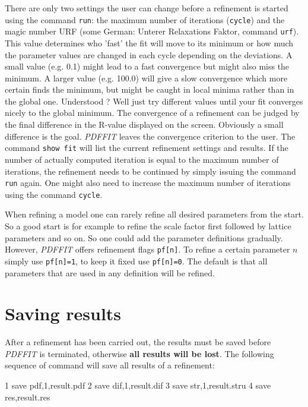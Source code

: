 There are only two settings the user can change before a refinement
is started using the command {\tt run}: the maximum number of iterations
({\tt cycle}) and the magic number URF (some German: Unterer Relaxations
Faktor, command {\tt urf}). This value determines who 'fast' the fit
will move to its minimum or how much the parameter values are changed
in each cycle depending on the deviations. A small value (e.g. 0.1) might
lead to a fast convergence but might also miss the minimum. A larger
value (e.g. 100.0) will give a slow convergence which more certain
finds the minimum, but might be caught in local minima rather than in
the global one. Understood ? Well just try different values until your
fit converges nicely to the global minimum. The convergence of a
refinement can be judged by the final difference in the R-value displayed
on the screen. Obviously a small difference is the goal. {\it PDFFIT}
leaves the convergence criterion to the user. The command {\tt show fit}
will list the current refinement settings and results. If the number of
actually computed iteration is equal to the maximum number of iterations,
the refinement needs to be continued by simply issuing the command
{\tt run} again. One might also need to increase the maximum number
of iterations using the command {\tt cycle}. \par

When refining a model one can rarely refine all desired parameters
from the start. So a good start is for example to refine the scale
factor first followed by lattice parameters and so on. So one could
add the parameter definitions gradually. However, {\it PDFFIT} offers
refinement flags {\tt pf[n]}. To refine a certain parameter $n$ simply
use {\tt pf[n]=1}, to keep it fixed use {\tt pf[n]=0}. The default is
that all parameters that are used in any definition will be refined.

\section{Saving results \label{fit_save}}

After a refinement has been carried out, the results must be
saved before {\it PDFFIT} is terminated, otherwise {\bf all
results will be lost}. The following sequence of command will
save all results of a refinement:

\footnotesize
\begin{MacVerbatim}
      1 save pdf,1,result.pdf
      2 save dif,1,result.dif
      3 save str,1,result.stru
      4 save res,result.res
\end{MacVerbatim}
\normalsize

